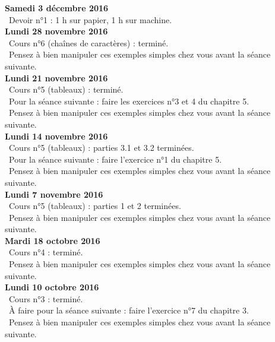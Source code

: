 \documentclass[12pt,a4paper]{article}
\begin{document}
\noindent\textbf{Samedi 3 décembre 2016}\\
\bu\ Devoir n°1 : 1 h sur papier, 1 h sur machine.\vspace{.4cm}\\

\noindent\textbf{Lundi 28 novembre 2016 }\\
\bu\ Cours n°6 (chaînes de caractères) : terminé. \\
\bu\ Pensez à bien manipuler ces exemples simples chez vous avant la séance suivante. \vspace{.4cm}\\

\noindent\textbf{Lundi 21 novembre 2016 }\\
\bu\ Cours n°5 (tableaux) : terminé. \\
\bu\ Pour la séance suivante : faire les exercices n°3 et 4 du chapitre 5. \\
\bu\ Pensez à bien manipuler ces exemples simples chez vous avant la séance suivante. \vspace{.4cm}\\

\noindent\textbf{Lundi 14 novembre 2016 }\\
\bu\ Cours n°5 (tableaux) : parties 3.1 et 3.2 terminées. \\
\bu\ Pour la séance suivante : faire l'exercice n°1 du chapitre 5. \\
\bu\ Pensez à bien manipuler ces exemples simples chez vous avant la séance suivante. \vspace{.4cm}\\

\noindent\textbf{Lundi 7 novembre 2016 }\\
\bu\ Cours n°5 (tableaux) : parties 1 et 2 terminées. \\
\bu\ Pensez à bien manipuler ces exemples simples chez vous avant la séance suivante. \vspace{.4cm}\\

\noindent\textbf{Mardi 18 octobre 2016 }\\
\bu\ Cours n°4 : terminé. \\
\bu\ Pensez à bien manipuler ces exemples simples chez vous avant la séance suivante. \vspace{.4cm}\\

\noindent\textbf{Lundi 10 octobre 2016 }\\
\bu\ Cours n°3 : terminé. \\
\bu\ À faire pour la séance suivante : faire l'exercice n°7 du chapitre 3. \\
\bu\ Pensez à bien manipuler ces exemples simples chez vous avant la séance suivante. \vspace{.4cm}\\
\end{document}
